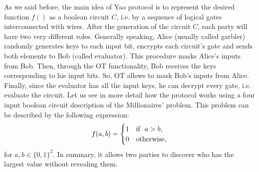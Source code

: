 As we said before, the main idea of Yao protocol is to represent the desired function $f()$ as a boolean circuit $C$, i.e. by a sequence of logical gates interconnected with wires. After the generation of the circuit $C$, each party will have two very different roles. Generally speaking, Alice (usually called garbler) randomly generates keys to each input bit, encrypts each circuit's gate and sends both elements to Bob (called evaluator). This procedure masks Alice's inputs from Bob. Then, through the OT functionality, Bob receives the keys corresponding to his input bits. So, OT allows to mask Bob's inputs from Alice. Finally, since the evaluator has all the input keys, he can decrypt every gate, i.e. evaluate the circuit. Let us see in more detail how the protocol works using a four input boolean circuit description of the Millionaires' problem. This problem can be described by the following expression:
\begin{equation}
f(a, b) = 
     \begin{cases} 
      1 & \mathrm{if} \hspace{0.2cm} a>b, \\
      0 & \mathrm{otherwise},
   \end{cases}
\label{eq:MPeq}
\end{equation}   
for $a, b \in \{0,1\}^2$. In summary, it allows two parties to discover who has the largest value without revealing them.

